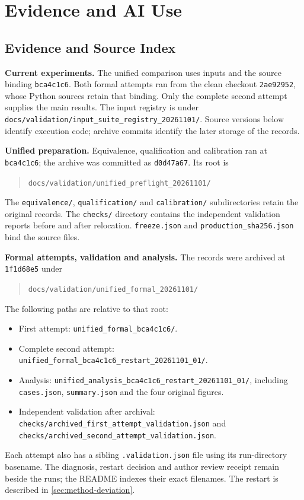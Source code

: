 \chapter{Evidence and AI Use}
\label{app:claim-traceability}
\label{sec:appendix-revision-bindings}

\section{Evidence and Source Index}
\label{sec:appendix-current-formal}
\label{sec:appendix-development-coverage}
\label{sec:appendix-history}
\label{sec:appendix-external-review}

\textbf{Current experiments.} The unified comparison uses \UnifiedN{} inputs
and the source binding \texttt{bca4c1c6}. Both formal attempts ran from the
clean checkout \texttt{2ae92952}, whose Python sources retain that binding.
Only the complete second attempt supplies the main results. The input registry
is under \nolinkurl{docs/validation/input_suite_registry_20261101/}.
Source versions below identify execution code; archive commits identify the
later storage of the records.

\textbf{Unified preparation.} Equivalence, qualification and calibration ran
at \texttt{bca4c1c6}; the archive was committed as \texttt{d0d47a67}. Its root is
\begin{quote}\small
\nolinkurl{docs/validation/unified_preflight_20261101/}
\end{quote}
The \nolinkurl{equivalence/}, \nolinkurl{qualification/} and
\nolinkurl{calibration/} subdirectories retain the original records.
The \nolinkurl{checks/} directory contains the independent validation reports
before and after relocation. \nolinkurl{freeze.json} and
\nolinkurl{production_sha256.json} bind the source files.

\textbf{Formal attempts, validation and analysis.} The records were archived
at \texttt{1f1d68e5} under
\begin{quote}\small
\nolinkurl{docs/validation/unified_formal_20261101/}
\end{quote}
The following paths are relative to that root:
\begin{itemize}
\item First attempt: \nolinkurl{unified_formal_bca4c1c6/}.
\item Complete second attempt:
\nolinkurl{unified_formal_bca4c1c6_restart_20261101_01/}.
\item Analysis:
\nolinkurl{unified_analysis_bca4c1c6_restart_20261101_01/}, including
\nolinkurl{cases.json}, \nolinkurl{summary.json} and the four original figures.
\item Independent validation after archival:
\nolinkurl{checks/archived_first_attempt_validation.json} and
\nolinkurl{checks/archived_second_attempt_validation.json}.
\end{itemize}
Each attempt also has a sibling \nolinkurl{.validation.json} file using its
run-directory basename. The diagnosis, restart decision and author review
receipt remain beside the runs; the README indexes their exact filenames.
The restart is described in \cref{sec:method-deviation}.


